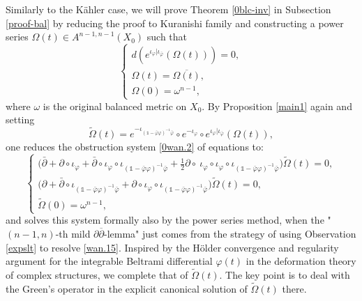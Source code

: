 \documentclass[12pt]{amsart}
\numberwithin{equation}{section}
\renewcommand{\1}{\mathds{1}}
\newcommand{\db}{\overline{\partial}}
\newcommand{\om}{\omega}
\renewcommand{\>}{\rightarrow}
\newcommand{\p}{\partial}
\def\p{\partial}
\def\o{\overline}
\def\b{\bar}
\def\om{\omega}
\begin{document}
Similarly to the K\"ahler case, we will prove Theorem \ref{0blc-inv} in Subsection \ref{proof-bal}
by reducing the proof to Kuranishi family and constructing a power series $\Omega(t)\in A^{n-1,n-1}(X_0)$ such
that
\begin{equation}\label{0wan.2}
    \begin{cases}
      d(e^{\iota_{\varphi}|\iota_{\b{\varphi}}}(\Omega(t)))=0,\\
      \Omega(t)=\o{\Omega(t)},\\
      \Omega(0)=\omega^{n-1},
    \end{cases}
\end{equation}
where $\om$ is the original balanced metric on $X_0$.  By
Proposition \ref{main1} again and setting
\[
\tilde{\Omega}(t)=e^{-\iota_{(\1-\b{\varphi}\varphi)^{-1}\b{\varphi}}}\circ
e^{-\iota_{\varphi}}\circ
e^{\iota_{\varphi}|\iota_{\b{\varphi}}}(\Omega(t)),
\]
one reduces the obstruction system \eqref{0wan.2} of
equations to:
\begin{equation}\label{wan.15}
    \begin{cases}
      \big(\b{\p}+\p\circ \iota_{\varphi}+\b{\p}\circ \iota_{\varphi}\circ \iota_{(\1-\b{\varphi}\varphi)^{-1}\b{\varphi}}+\frac{1}{2}\p\circ\ \iota_{\varphi}\circ \iota_{\varphi}\circ \iota_{(\1-\b{\varphi}\varphi)^{-1}\b{\varphi}}\big)\tilde{\Omega}(t)=0,\\
      \big(\p+\b{\p}\circ \iota_{(\1-\b{\varphi}\varphi)^{-1}\b{\varphi}}+\p\circ \iota_{\varphi}\circ \iota_{(\1-\b{\varphi}\varphi)^{-1}\b{\varphi}}\big)\tilde{\Omega}(t)=0,\\
      \tilde{\Omega}(0)=\omega^{n-1},
    \end{cases}
 \end{equation}
 and solves this system formally also by the power series method,
when the "$(n-1,n)$-th mild $\p\db$-lemma" just comes
from the strategy of using Observation \ref{expslt} to resolve \eqref{wan.15}.
 Inspired by the  H\"older  convergence
and regularity argument for the integrable Beltrami differential
$\varphi(t)$ in the deformation theory of complex structures, we
complete that of $\tilde{\Omega}(t)$. The key point is to deal
with the Green's operator
in the explicit canonical solution of $\tilde{\Omega}(t)$ there.
\end{document}
